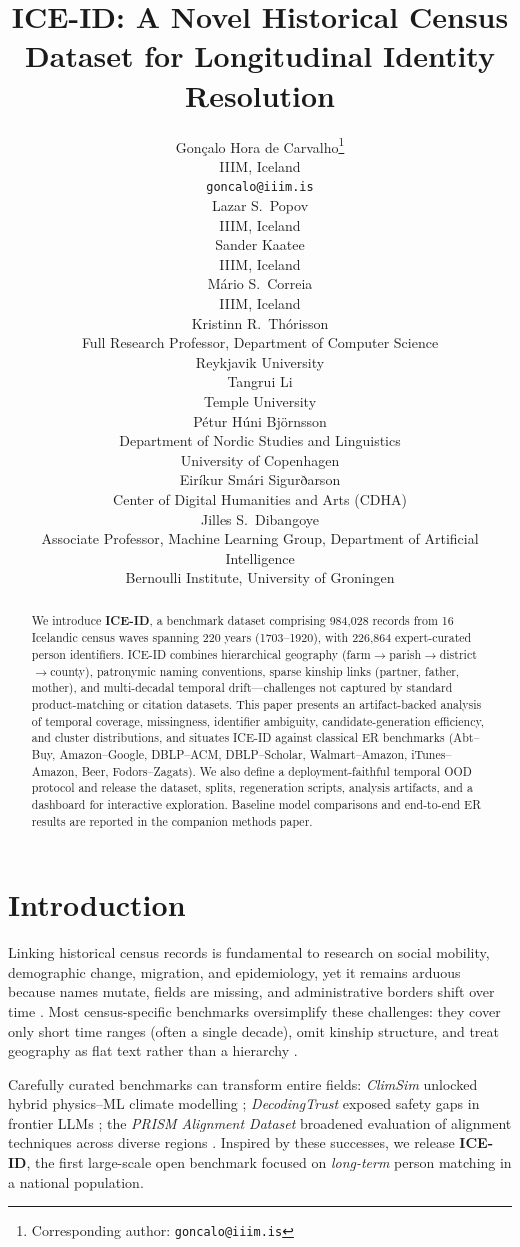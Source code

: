 \documentclass{article}
\title{ICE-ID: A Novel Historical Census Dataset for Longitudinal Identity Resolution}
\author{%
   Gonçalo Hora de Carvalho\thanks{Corresponding author: \texttt{goncalo@iiim.is}} \\
  IIIM, Iceland \\
  \texttt{goncalo@iiim.is} \\
  \And
  Lazar S.~Popov \\
  IIIM, Iceland \\
  \And
  Sander Kaatee \\
  IIIM, Iceland \\
  \AND
  M\'ario S.~Correia \\
  IIIM, Iceland \\
  \AND
  Kristinn R.~Thórisson \\
  Full Research Professor, Department of Computer Science\\
  Reykjavik University\\
  \And
  Tangrui Li \\
  Temple University\\
  \And
  Pétur Húni Björnsson \\
  Department of Nordic Studies and Linguistics\\
  University of Copenhagen\\
  \And
  Eiríkur Smári Sigurðarson \\
  Center of Digital Humanities and Arts (CDHA)\\
  \And
  Jilles S.~Dibangoye \\
  Associate Professor, Machine Learning Group, Department of Artificial Intelligence\\
  Bernoulli Institute, University of Groningen\\
}
\begin{document}
\maketitle


\begin{abstract}
We introduce \textbf{ICE-ID}, a benchmark dataset comprising 984,028 records from 16 Icelandic census waves spanning 220 years (1703--1920), with 226,864 expert-curated person identifiers. ICE-ID combines hierarchical geography (farm$\to$parish$\to$district$\to$county), patronymic naming conventions, sparse kinship links (partner, father, mother), and multi-decadal temporal drift---challenges not captured by standard product-matching or citation datasets. This paper presents an artifact-backed analysis of temporal coverage, missingness, identifier ambiguity, candidate-generation efficiency, and cluster distributions, and situates ICE-ID against classical ER benchmarks (Abt--Buy, Amazon--Google, DBLP--ACM, DBLP--Scholar, Walmart--Amazon, iTunes--Amazon, Beer, Fodors--Zagats). We also define a deployment-faithful temporal OOD protocol and release the dataset, splits, regeneration scripts, analysis artifacts, and a dashboard for interactive exploration. Baseline model comparisons and end-to-end ER results are reported in the companion methods paper.
\end{abstract}


\section{Introduction}

Linking historical census records is fundamental to research on social mobility, demographic change, migration, and epidemiology, yet it remains arduous because names mutate, fields are missing, and administrative borders shift over time \cite{ruggles2018historical, bailey2020}. Most census-specific benchmarks oversimplify these challenges: they cover only short time ranges (often a single decade), omit kinship structure, and treat geography as flat text rather than a hierarchy \cite{papadakis2023}.

Carefully curated benchmarks can transform entire fields: \emph{ClimSim} unlocked hybrid physics--ML climate modelling \cite{ClimSim2024}; \emph{DecodingTrust} exposed safety gaps in frontier LLMs \cite{DecodingTrust2023}; the \emph{PRISM Alignment Dataset} broadened evaluation of alignment techniques across diverse regions \cite{PRISM2024}. Inspired by these successes, we release \textbf{ICE-ID}, the first large-scale open benchmark focused on \emph{long-term} person matching in a national population.
\end{document}
